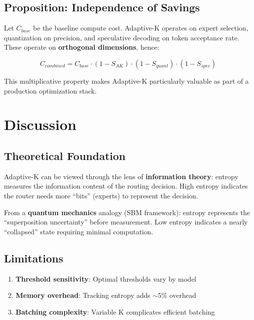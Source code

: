 \documentclass{article}
\begin{document}
\subsection{Proposition: Independence of Savings}

Let $C_{base}$ be the baseline compute cost. Adaptive-K operates on expert selection, quantization on precision, and speculative decoding on token acceptance rate. These operate on \textbf{orthogonal dimensions}, hence:

\begin{equation}
C_{combined} = C_{base} \cdot (1 - S_{AK}) \cdot (1 - S_{quant}) \cdot (1 - S_{spec})
\end{equation}

This multiplicative property makes Adaptive-K particularly valuable as part of a production optimization stack.

\section{Discussion}

\subsection{Theoretical Foundation}

Adaptive-K can be viewed through the lens of \textbf{information theory}: entropy measures the information content of the routing decision. High entropy indicates the router needs more ``bits'' (experts) to represent the decision.

From a \textbf{quantum mechanics} analogy (SBM framework): entropy represents the ``superposition uncertainty'' before measurement. Low entropy indicates a nearly ``collapsed'' state requiring minimal computation.

\subsection{Limitations}

\begin{enumerate}
    \item \textbf{Threshold sensitivity}: Optimal thresholds vary by model
    \item \textbf{Memory overhead}: Tracking entropy adds $\sim$5\% overhead
    \item \textbf{Batching complexity}: Variable K complicates efficient batching
\end{enumerate}
\end{document}
